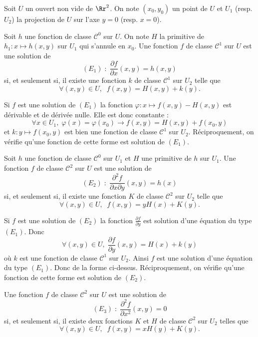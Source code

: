 \documentclass[11pt, class=report,crop=false]{standalone}
\begin{document}
\noindent Soit $U$ un ouvert non vide de $\Rr^2$. On note $(x_0,y_0)$ un point de $U$ et $U_1$ (resp. $U_2$) la projection de $U$ sur l'axe $y=0$ (resp. $x=0$).

\vskip6mm

\begin{proposition}Soit $h$ une fonction de classe $\mathscr{C}^0$ sur $U$. On note $H$ la primitive de $h_1:x\mapsto h(x,y)$ sur $U_1$ qui s'annule en $x_0$. Une fonction $f$ de classe $\mathscr{C}^1$ sur $U$ est une solution de 
$$(E_1)\; :\; \frac{\partial f}{\partial x}(x,y)=h(x,y)$$
si, et seulement si, il existe une fonction $k$ de classe $\mathscr{C}^1$ sur $U_2$ telle que
$$\forall (x,y)\in U,\; \; f(x,y)=H(x,y)+k(y).$$
\end{proposition}

\vskip4mm

Si $f$ est une solution de $(E_1)$ la fonction $\varphi :x\mapsto f(x,y)-H(x,y)$ est dérivable et de dérivée nulle. Elle est donc constante :
$$\forall x\in U_1,\; \varphi (x)=\varphi (x_0)\rightarrow f(x,y)=H(x,y)+f(x_0,y)$$
et $k:y\mapsto f(x_0,y)$ est bien une fonction de classe $\mathscr{C}^1$ sur $U_2$. Réciproquement, on vérifie qu'une fonction de cette forme est solution de $(E_1)$.

\vskip6mm

\begin{proposition}Soit $h$ une fonction de classe $\mathscr{C}^0$ sur $U_1$ et $H$ une primitive de $h$ sur $U_1$. Une fonction $f$ de classe $\mathscr{C}^2$ sur $U$ est une solution de 
$$(E_2)\; :\; \frac{\partial ^2f}{\partial x\partial y}(x,y)=h(x)$$
si, et seulement si, il existe une fonction $K$ de classe $\mathscr{C}^2$ sur $U_2$ telle que
$$\forall (x,y)\in U,\; \; f(x,y)=yH(x)+K(y).$$
\end{proposition}

\vskip4mm

Si $f$ est une solution de $(E_2)$ la fonction $\displaystyle \frac{\partial f}{\partial y}$ est solution d'une équation du type $(E_1)$. Donc
$$\forall (x,y)\in U,\; \frac{\partial f}{\partial y}(x,y)=H(x)+k(y)$$
o\`u $k$ est une fonction de classe $\mathscr{C}^1$ sur $U_2$. Ainsi $f$ est une solution d'une équation du type $(E_1)$. Donc de la forme ci-dessus.  Réciproquement, on vérifie qu'une fonction de cette forme est solution de $(E_2)$.

\vskip6mm

\begin{proposition}Une fonction $f$ de classe $\mathscr{C}^2$ sur $U$ est une solution de 
$$(E_3)\; :\; \frac{\partial ^2f}{\partial x^2}(x,y)=0$$
si, et seulement si, il existe deux fonctions $K$ et $H$ de classe $\mathscr{C}^2$ sur $U_2$ telles que
$$\forall (x,y)\in U,\; \; f(x,y)=xH(y)+K(y).$$
\end{proposition}
\end{document}
